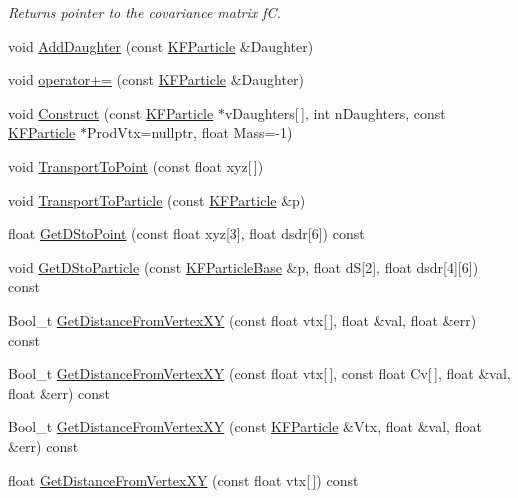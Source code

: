 \begin{DoxyCompactItemize}
\begin{DoxyCompactList}\small\item\em Returns pointer to the covariance matrix fC. \end{DoxyCompactList}\item 
void \hyperlink{classKFParticle_a07fc58ec0483c40d870ff1162d9e6a1d}{Add\+Daughter} (const \hyperlink{classKFParticle}{K\+F\+Particle} \&Daughter)
\item 
void \hyperlink{classKFParticle_adc75a098f1e5e4fe4e322715a8227be8}{operator+=} (const \hyperlink{classKFParticle}{K\+F\+Particle} \&Daughter)
\item 
void \hyperlink{classKFParticle_ac336c1fd04ed435827dc29e684beb906}{Construct} (const \hyperlink{classKFParticle}{K\+F\+Particle} $\ast$v\+Daughters\mbox{[}$\,$\mbox{]}, int n\+Daughters, const \hyperlink{classKFParticle}{K\+F\+Particle} $\ast$Prod\+Vtx=nullptr, float Mass=-\/1)
\item 
void \hyperlink{classKFParticle_ae3e9fe6655354f5cb043eb36639f6d65}{Transport\+To\+Point} (const float xyz\mbox{[}$\,$\mbox{]})
\item 
void \hyperlink{classKFParticle_a809cab20c82d4e5e58ed6d2f6913d14f}{Transport\+To\+Particle} (const \hyperlink{classKFParticle}{K\+F\+Particle} \&p)
\item 
float \hyperlink{classKFParticle_af0e557256a15e60b0e3873490267b20f}{Get\+D\+Sto\+Point} (const float xyz\mbox{[}3\mbox{]}, float dsdr\mbox{[}6\mbox{]}) const 
\item 
void \hyperlink{classKFParticle_a1dfa2f6c4ec75c76a1b2aae35c05cae7}{Get\+D\+Sto\+Particle} (const \hyperlink{classKFParticleBase}{K\+F\+Particle\+Base} \&p, float dS\mbox{[}2\mbox{]}, float dsdr\mbox{[}4\mbox{]}\mbox{[}6\mbox{]}) const 
\item 
Bool\+\_\+t \hyperlink{classKFParticle_aa046ed0c434f62751066884405e1b380}{Get\+Distance\+From\+Vertex\+XY} (const float vtx\mbox{[}$\,$\mbox{]}, float \&val, float \&err) const 
\item 
Bool\+\_\+t \hyperlink{classKFParticle_a23612b32d0f5c8002731de325512843b}{Get\+Distance\+From\+Vertex\+XY} (const float vtx\mbox{[}$\,$\mbox{]}, const float Cv\mbox{[}$\,$\mbox{]}, float \&val, float \&err) const 
\item 
Bool\+\_\+t \hyperlink{classKFParticle_aa58e122337df9c2eb1bce3cca94b97ae}{Get\+Distance\+From\+Vertex\+XY} (const \hyperlink{classKFParticle}{K\+F\+Particle} \&Vtx, float \&val, float \&err) const 
\item 
float \hyperlink{classKFParticle_a2eb880056d6719b78e38a2027c32b0e9}{Get\+Distance\+From\+Vertex\+XY} (const float vtx\mbox{[}$\,$\mbox{]}) const 

\end{DoxyCompactItemize}
